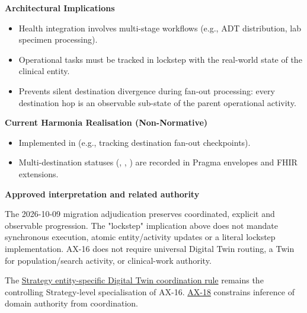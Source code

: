 \par\medskip\textbf{Architectural Implications}\par


\begin{itemize}


\item Health integration involves multi-stage workflows (e.g., ADT distribution, lab specimen processing).

\item Operational tasks must be tracked in lockstep with the real-world state of the clinical entity.

\item Prevents silent destination divergence during fan-out processing: every destination hop is an observable sub-state of the parent operational activity.

\end{itemize}


\par\medskip\textbf{Current Harmonia Realisation (Non-Normative)}\par


\begin{itemize}


\item Implemented in \texttt{} (e.g., \texttt{} tracking destination fan-out checkpoints).

\item Multi-destination statuses (\texttt{}, \texttt{}, \texttt{}) are recorded in Pragma envelopes and FHIR \texttt{} extensions.

\end{itemize}


\par\medskip\textbf{Approved interpretation and related authority}\par


The 2026-10-09 migration adjudication preserves coordinated, explicit and
observable progression. The "lockstep" implication above does not mandate
synchronous execution, atomic entity/activity updates or a literal lockstep
implementation. AX-16 does not require universal Digital Twin routing, a Twin
for population/search activity, or clinical-work authority.



The \href{\detokenize{../../../../../../../../docs/markdown/02-strategy/strategic-views/logical-component-responsibilities.md#entity-specific-operational-coordination}}{Strategy entity-specific Digital Twin coordination rule}
remains the controlling Strategy-level specialisation of AX-16.
\hyperref[element:b8cafe3cf5904d2bb9a9767260fddf78]{AX-18} constrains inference of domain authority from coordination.



